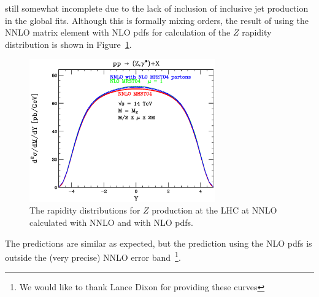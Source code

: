 \documentclass[12pt]{iopart}
\begin{document}
still somewhat incomplete due to the lack of inclusion of inclusive jet production in the global fits. Although
this is formally mixing orders, the result of using the NNLO matrix element with NLO pdfs for calculation of
the $Z$ rapidity distribution is shown in Figure~\ref{fig:nlo_z}.
%
\begin{figure}[t]
\begin{center}
\includegraphics[width=8cm]{ZNNLONLO.ps}
\end{center}
\caption{
The rapidity distributions for $Z$ production at the LHC at NNLO calculated with NNLO and with NLO pdfs. } 
\label{fig:nlo_z}
\end{figure}
%
The predictions are similar as expected, but
the prediction using the NLO pdfs is outside the (very precise) NNLO error band~\footnote{
We would like to thank Lance Dixon for providing these curves}. 
\end{document}
